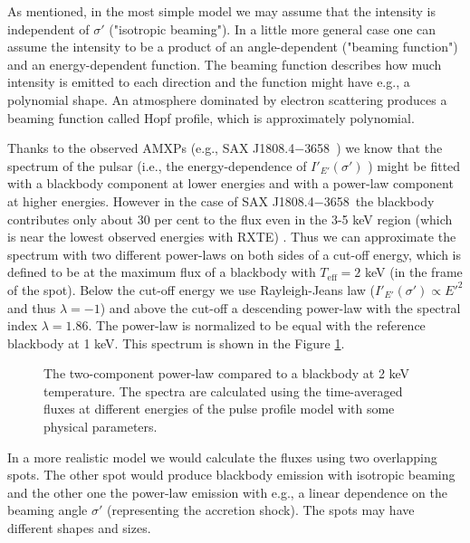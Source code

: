 \documentclass{wihuri}
\def\Dop{\delta}
\def\source{SAX J1808.4$-$3658}
\begin{document}

As mentioned, in the most simple model we may assume that the intensity is independent of $\sigma'$ ("isotropic beaming"). In a little more general case one can assume the intensity to be a product of an angle-dependent ("beaming function") and an energy-dependent function. The beaming function describes how much intensity is emitted to each direction and the function might have e.g., a polynomial shape. An atmosphere dominated by electron scattering produces a beaming function called Hopf profile, which is approximately polynomial.  


Thanks to the observed AMXPs (e.g., \source \ \cite{poutagierlinskisax}) we know that the spectrum of the pulsar (i.e., the energy-dependence of $I'_{E'}(\sigma')$ ) might be fitted with a blackbody component at lower energies and with a power-law component at higher energies. However in the case of \source \ the blackbody contributes only about 30 per cent to the flux even in the 3-5 keV region (which is near the lowest observed energies with RXTE) \cite{poutagierlinskisax}. Thus we can approximate the spectrum with two different power-laws on both sides of a cut-off energy, which is defined to be at the maximum flux of a blackbody with $T_{\mathrm{eff}} = 2 $ keV (in the frame of the spot). Below the cut-off energy we use Rayleigh-Jeans law ($I'_{E'}(\sigma') \propto E '^{2}$ and thus $\lambda = -1$) and above the cut-off a descending power-law with the spectral index $\lambda = 1.86$. The power-law is normalized to be equal with the reference blackbody at 1 keV. This spectrum is shown in the Figure \ref{fig:spectrum}.


\begin{figure}
\centerline{}
\caption{The two-component power-law compared to a blackbody at 2 keV temperature. The spectra are calculated using the time-averaged fluxes at different energies of the pulse profile model with some physical parameters. 
\label{fig:spectrum}}
\end{figure}


In a more realistic model we would calculate the fluxes using two overlapping spots. The other spot would produce blackbody emission with isotropic beaming and the other one the power-law emission with e.g., a linear dependence on the beaming angle $\sigma'$ (representing the accretion shock). The spots may have different shapes and sizes. %
\end{document}
